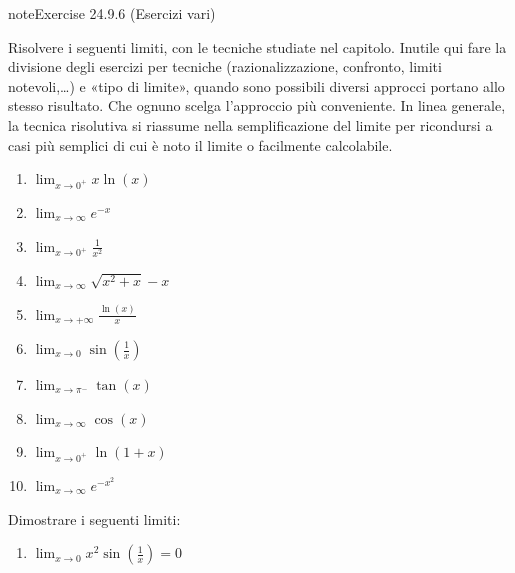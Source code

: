 \documentclass[letterpaper,10pt,italian]{jupyterBook}
\begin{document}
\begin{sphinxadmonition}{note}{Exercise 24.9.6 (Esercizi vari)}





\sphinxAtStartPar
Risolvere i seguenti limiti, con le tecniche studiate nel capitolo. Inutile qui fare la divisione degli esercizi per tecniche (razionalizzazione, confronto, limiti notevoli,…) e «tipo di limite», quando sono possibili diversi approcci portano allo stesso risultato. Che ognuno scelga l’approccio più conveniente. In linea generale, la tecnica risolutiva si riassume nella semplificazione del limite per ricondursi a casi più semplici di cui è noto il limite o facilmente calcolabile.
\begin{enumerate}
%
\item {} 
\sphinxAtStartPar
\(\lim_{x \to 0^+} x \ln(x)\)

\item {} 
\sphinxAtStartPar
\(\lim_{x \to \infty} e^{-x}\)

\item {} 
\sphinxAtStartPar
\(\lim_{x \to 0^+} \frac{1}{x^2}\)

\item {} 
\sphinxAtStartPar
\(\lim_{x \to \infty} \sqrt{x^2 + x} - x\)

\item {} 
\sphinxAtStartPar
\(\lim_{x \to +\infty} \frac{\ln(x)}{x}\)

\item {} 
\sphinxAtStartPar
\(\lim_{x \to 0} \sin\left(\frac{1}{x}\right)\)

\item {} 
\sphinxAtStartPar
\(\lim_{x \to \pi^-} \tan(x)\)

\item {} 
\sphinxAtStartPar
\(\lim_{x \to \infty} \cos(x)\)

\item {} 
\sphinxAtStartPar
\(\lim_{x \to 0^+} \ln(1 + x)\)

\item {} 
\sphinxAtStartPar
\(\lim_{x \to \infty} e^{-x^2}\)

\end{enumerate}

\sphinxAtStartPar
Dimostrare i seguenti limiti:
\begin{enumerate}
%
\item {} 
\sphinxAtStartPar
\(\lim_{x \to 0} x^2 \sin\left(\frac{1}{x}\right) = 0\)


\end{enumerate}
\end{sphinxadmonition}
\end{document}
